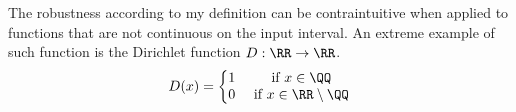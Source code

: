 %
%
%

The robustness according to my definition can be contraintuitive
when applied to functions that are not continuous on the input interval.
An extreme example of such function is the Dirichlet function $D: \RR\to \RR$.
\begin{equation*}
    D(x) = \left\{
        \begin{matrix}
            1 & \text{ if } x\in \QQ\\
            0 & \text{ if } x\in \RR\setminus \QQ
        \end{matrix}
        \right.
\end{equation*}

